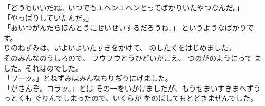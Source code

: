 \documentclass[
a4paper,
10pt,
book]
{tarticle}
\begin{document}
\newpage
\thispagestyle{fancy}
\fancyhead[R]{\empty}
「どうもいいだね。いつでもエヘンエヘンとってばかりいたやつなんだ。」\\
「やっぱりしていたんだ。」\\
「あいつがんだらほんとうにせいせいするだろうね。」
というようなばかりです。\\
\indent {}りのねずみは、いよいよいたすきをかけて、
のしたくをはじめました。\\
\indent そのみんなのうしろので、
フウフウとうひどいがこえ、
つのがのようにって
ました。それはのでした。\\
「ワーッ。」とねずみはみんなちりぢりにげました。\\
「がさんぞ。コラッ。」とは
その一をいかけましたが、もうせまいすきまへずうっとくも
ぐりんでしまったので、いくらが
をのばしてもとどきませんでした。

\newpage
\thispagestyle{fancy}
\fancyhead[C]{\empty}
\end{document}
